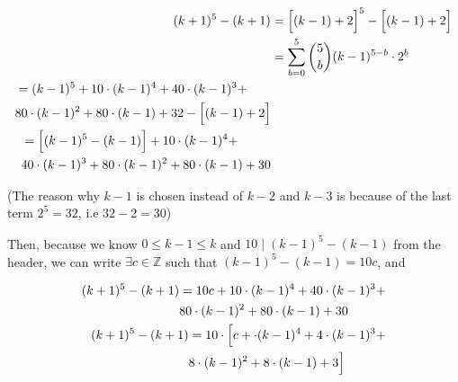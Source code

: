 \documentclass[12pt]{article}
\begin{document}
\begin{itemize}
\begin{itemize}
\begin{itemize}
\begin{mdframed}
\begin{enumerate}[1.]
\begin{mdframed}
                    \begin{align}
                        (k+1)^5 - (k+1) &= \Bigl[ (k-1) + 2 \Bigr]^5 - \Bigl[ (k-1) + 2 \Bigr]\\
                        &= \sum\limits_{b=0}^5 \binom{5}{b} (k-1)^{5-b} \cdot 2^b\\
                        \begin{split}
                        &= (k-1)^5 + 10 \cdot (k-1)^4 + 40 \cdot (k-1)^3 + \\
                        & 80 \cdot (k-1)^2 + 80 \cdot(k-1) + 32 - \Bigl[ (k-1) + 2 \Bigr] \\
                        \end{split}\\
                        \begin{split}
                        &= \Bigl[ (k-1)^5 - (k-1) \Bigr] + 10 \cdot (k-1)^4 + \\
                        & 40 \cdot (k-1)^3 + 80 \cdot (k-1)^2 + 80 \cdot(k-1) + 30
                        \end{split}
                    \end{align}

                    (The reason why $k-1$ is chosen instead of $k-2$ and $k-3$ is
                    because of the last term $2^5 = 32$, i.e $32 -2 = 30$)

                    \bigskip

                    Then, because we know $0 \leq k - 1 \leq k$ and $10 \mid (k-1)^5 - (k-1)$
                    from the header, we can write $\exists c \in \mathbb{Z}$ such that
                    $(k-1)^5 - (k-1) = 10c$, and

                    \begin{align}
                        \begin{split}
                        (k+1)^5 - (k+1) &= 10c + 10 \cdot (k-1)^4 + 40 \cdot (k-1)^3 + \\
                        & 80 \cdot (k-1)^2 + 80 \cdot(k-1) + 30
                        \end{split}\\
                        \begin{split}
                        (k+1)^5 - (k+1) &= 10 \cdot \Bigl[c +\cdot (k-1)^4 + 4 \cdot (k-1)^3 + \\
                        & 8 \cdot (k-1)^2 + 8 \cdot(k-1) + 3\Bigr]
                        \end{split}\\
                    \end{align}


\end{mdframed}
\end{enumerate}
\end{mdframed}
\end{itemize}
\end{itemize}
\end{itemize}
\end{document}
